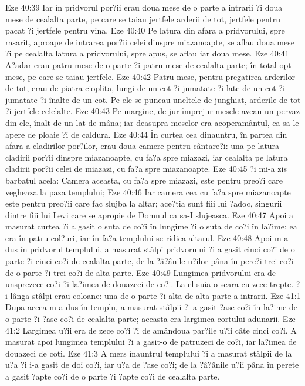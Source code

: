 Eze 40:39  Iar în pridvorul por?ii erau doua mese de o parte a intrarii ?i doua mese de cealalta parte, pe care se taiau jertfele arderii de tot, jertfele pentru pacat ?i jertfele pentru vina.
Eze 40:40  Pe latura din afara a pridvorului, spre rasarit, aproape de intrarea por?ii celei dinspre miazanoapte, se aflau doua mese ?i pe cealalta latura a pridvorului, spre apus, se aflau iar doua mese.
Eze 40:41  A?adar erau patru mese de o parte ?i patru mese de cealalta parte; în total opt mese, pe care se taiau jertfele.
Eze 40:42  Patru mese, pentru pregatirea arderilor de tot, erau de piatra cioplita, lungi de un cot ?i jumatate ?i late de un cot ?i jumatate ?i înalte de un cot. Pe ele se puneau uneltele de junghiat, arderile de tot ?i jertfele celelalte.
Eze 40:43  Pe margine, de jur împrejur mesele aveau un pervaz din ele, înalt de un lat de mâna; iar deasupra meselor era acoperamântul, ca sa le apere de ploaie ?i de caldura.
Eze 40:44  În curtea cea dinauntru, în partea din afara a cladirilor por?ilor, erau doua camere pentru cântare?i: una pe latura cladirii por?ii dinspre miazanoapte, cu fa?a spre miazazi, iar cealalta pe latura cladirii por?ii celei de miazazi, cu fa?a spre miazanoapte.
Eze 40:45  ?i mi-a zis barbatul acela: Camera aceasta, cu fa?a spre miazazi, este pentru preo?i care vegheaza la paza templului;
Eze 40:46  Iar camera cea cu fa?a spre miazanoapte este pentru preo?ii care fac slujba la altar; ace?tia sunt fiii lui ?adoc, singurii dintre fiii lui Levi care se apropie de Domnul ca sa-I slujeasca.
Eze 40:47  Apoi a masurat curtea ?i a gasit o suta de co?i în lungime ?i o suta de co?i în la?ime; ea era în patru col?uri, iar în fa?a templului se ridica altarul.
Eze 40:48  Apoi m-a dus în pridvorul templului, a masurat stâlpi pridvorului ?i a gasit cinci co?i de o parte ?i cinci co?i de cealalta parte, de la ?â?ânile u?ilor pâna în pere?i trei co?i de o parte ?i trei co?i de alta parte.
Eze 40:49  Lungimea pridvorului era de unsprezece co?i ?i la?imea de douazeci de co?i. La el suia o scara cu zece trepte. ?i lânga stâlpi erau coloane: una de o parte ?i alta de alta parte a intrarii.
Eze 41:1  Dupa aceea m-a dus în templu, a masurat stâlpii ?i a gasit ?ase co?i în la?ime de o parte ?i ?ase co?i de cealalta parte; aceasta era largimea cortului adunarii.
Eze 41:2  Largimea u?ii era de zece co?i ?i de amândoua par?ile u?ii câte cinci co?i. A masurat apoi lungimea templului ?i a gasit-o de patruzeci de co?i, iar la?imea de douazeci de coti.
Eze 41:3  A mers înauntrul templului ?i a masurat stâlpii de la u?a ?i i-a gasit de doi co?i, iar u?a de ?ase co?i; de la ?â?ânile u?ii pâna în perete a gasit ?apte co?i de o parte ?i ?apte co?i de cealalta parte.
